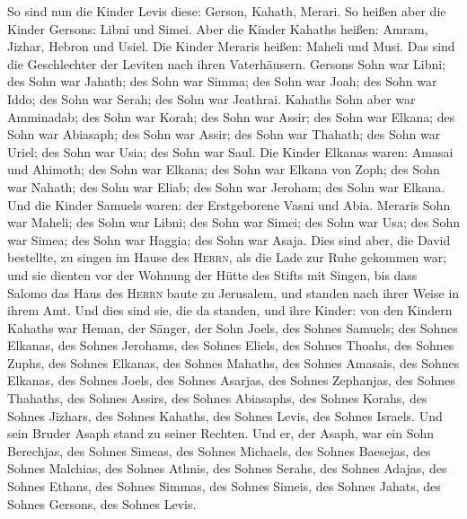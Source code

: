  So sind nun die Kinder Levis diese: Gerson, Kahath,
Merari.  So heißen aber die Kinder Gersons: Libni und
Simei.  Aber die Kinder Kahaths heißen: Amram, Jizhar,
Hebron und Usiel.  Die Kinder Meraris heißen: Maheli und
Musi. Das sind die Geschlechter der Leviten nach ihren Vaterhäusern.
 Gersons Sohn war Libni; des Sohn war Jahath; des Sohn war
Simma;  des Sohn war Joah; des Sohn war Iddo; des Sohn war
Serah; des Sohn war Jeathrai.  Kahaths Sohn aber war
Amminadab; des Sohn war Korah; des Sohn war Assir;  des
Sohn war Elkana; des Sohn war Abiasaph; des Sohn war Assir;
 des Sohn war Thahath; des Sohn war Uriel; des Sohn war
Usia; des Sohn war Saul.  Die Kinder Elkanas waren:
Amasai und Ahimoth;  des Sohn war Elkana; des Sohn war
Elkana von Zoph; des Sohn war Nahath;  des Sohn war
Eliab; des Sohn war Jeroham; des Sohn war Elkana.  Und
die Kinder Samuels waren: der Erstgeborene Vasni und Abia.
 Meraris Sohn war Maheli; des Sohn war Libni; des Sohn
war Simei; des Sohn war Usa;  des Sohn war Simea; des
Sohn war Haggia; des Sohn war Asaja.  Dies sind aber, die
David bestellte, zu singen im Hause des \textsc{Herrn}, als die Lade zur
Ruhe gekommen war;  und sie dienten vor der Wohnung der
Hütte des Stifts mit Singen, bis dass Salomo das Haus des \textsc{Herrn}
baute zu Jerusalem, und standen nach ihrer Weise in ihrem Amt.
 Und dies sind sie, die da standen, und ihre Kinder: von
den Kindern Kahaths war Heman, der Sänger, der Sohn Joels, des Sohnes
Samuels;  des Sohnes Elkanas, des Sohnes Jerohams, des
Sohnes Eliels, des Sohnes Thoahs,  des Sohnes Zuphs, des
Sohnes Elkanas, des Sohnes Mahaths, des Sohnes Amasais, 
des Sohnes Elkanas, des Sohnes Joels, des Sohnes Asarjas, des Sohnes
Zephanjas,  des Sohnes Thahaths, des Sohnes Assirs, des
Sohnes Abiasaphs, des Sohnes Korahs,  des Sohnes Jizhars,
des Sohnes Kahaths, des Sohnes Levis, des Sohnes Israels.
 Und sein Bruder Asaph stand zu seiner Rechten. Und er,
der Asaph, war ein Sohn Berechjas, des Sohnes Simeas, 
des Sohnes Michaels, des Sohnes Baesejas, des Sohnes Malchias,
 des Sohnes Athnis, des Sohnes Serahs, des Sohnes Adajas,
 des Sohnes Ethans, des Sohnes Simmas, des Sohnes Simeis,
 des Sohnes Jahats, des Sohnes Gersons, des Sohnes Levis.
